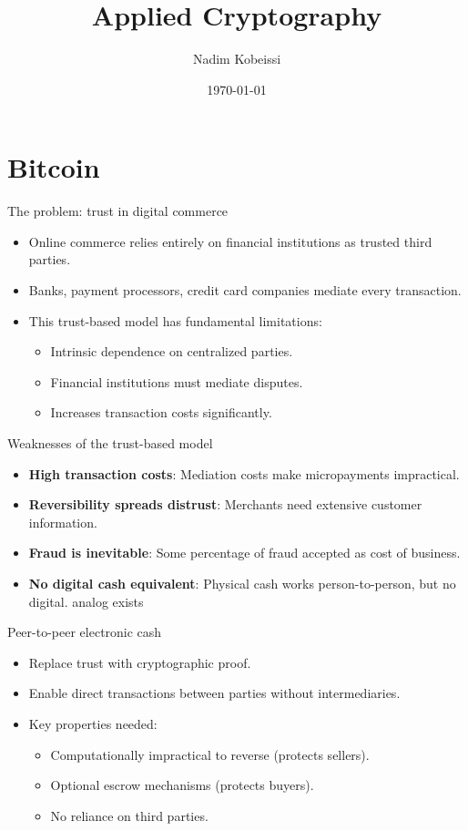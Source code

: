 \documentclass[aspectratio=169, lualatex, handout]{beamer}
\title{Applied Cryptography}
\author{Nadim Kobeissi}
\institute{American University of Beirut}
\date{\today}
\begin{document}
\begin{frame}[plain]
	\titlepage
\end{frame}

\section{Bitcoin}

\begin{frame}{The problem: trust in digital commerce}
	\begin{itemize}
		\item Online commerce relies entirely on financial institutions as trusted third parties.
		\item Banks, payment processors, credit card companies mediate every transaction.
		\item This trust-based model has fundamental limitations:
		      \begin{itemize}
			      \item Intrinsic dependence on centralized parties.
			      \item Financial institutions must mediate disputes.
			      \item Increases transaction costs significantly.
		      \end{itemize}
	\end{itemize}
\end{frame}

\begin{frame}{Weaknesses of the trust-based model}
	\begin{itemize}
		\item \textbf{High transaction costs}: Mediation costs make micropayments impractical.
		\item \textbf{Reversibility spreads distrust}: Merchants need extensive customer information.
		\item \textbf{Fraud is inevitable}: Some percentage of fraud accepted as cost of business.
		\item \textbf{No digital cash equivalent}: Physical cash works person-to-person, but no digital. analog exists
	\end{itemize}
\end{frame}

\begin{frame}{Peer-to-peer electronic cash}
	\begin{itemize}
		\item Replace trust with cryptographic proof.
		\item Enable direct transactions between parties without intermediaries.
		\item Key properties needed:
		      \begin{itemize}
			      \item Computationally impractical to reverse (protects sellers).
			      \item Optional escrow mechanisms (protects buyers).
			      \item No reliance on third parties.
		      \end{itemize}
	\end{itemize}
\end{frame}
\end{document}
